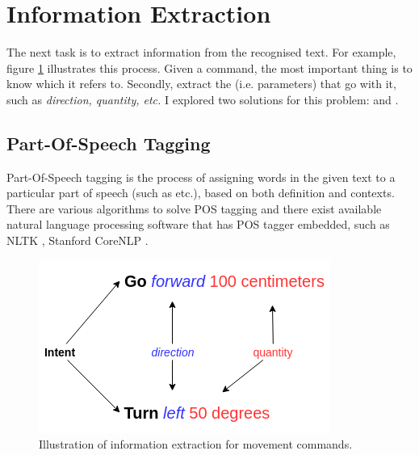 \section{Information Extraction}
\label{sec:InfoExt}
The next task is to extract information from the recognised text. For example, figure \ref{fig:InfoExt} illustrates this process. Given a command, the most important thing is to know which  it refers to. Secondly, extract the  (i.e. parameters) that go with it, such as \textit{direction, quantity, etc.} I explored two solutions for this problem:  and .

\subsection{Part-Of-Speech Tagging}
Part-Of-Speech tagging is the process of assigning words in the given text to a particular part of speech (such as  etc.), based on both definition and contexts. There are various algorithms to solve POS tagging \cite{Jurafsky:2009:SLP:1214993} and there exist available natural language processing software that has POS tagger embedded, such as NLTK \cite{Loper:2002:NNL:1118108.1118117}, Stanford CoreNLP \cite{manning-EtAl:2014:P14-5}. 

\begin{figure}[tb]
	\centering
	\includegraphics[width=0.6\hsize]{./figures/InfoExt}
	\caption{Illustration of information extraction for movement commands.}
	\label{fig:InfoExt}
\end{figure}

